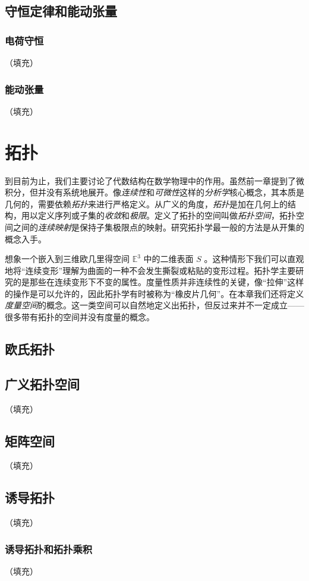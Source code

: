 \documentclass[hyperref,UTF8]{ctexbook}
\begin{document}
\section{守恒定律和能动张量}

\subsection{电荷守恒}（填充）
\subsection{能动张量}（填充）
\chapter{拓扑}
到目前为止，我们主要讨论了代数结构在数学物理中的作用。虽然前一章提到了微积分，但并没有系统地展开。像\emph{连续性}和\emph{可微性}这样的\emph{分析学}核心概念，其本质是几何的，需要依赖\emph{拓扑}来进行严格定义。从广义的角度，\emph{拓扑}是加在几何上的结构，用以定义序列或子集的\emph{收敛}和\emph{极限}。定义了拓扑的空间叫做\emph{拓扑空间}，拓扑空间之间的\emph{连续映射}是保持子集极限点的映射。研究拓扑学最一般的方法是从开集的概念入手。

想象一个嵌入到三维欧几里得空间 $\mathbb{E}^{3}$ 中的二维表面 $S$ 。这种情形下我们可以直观地将“连续变形”理解为曲面的一种不会发生撕裂或粘贴的变形过程。拓扑学主要研究的是那些在连续变形下不变的属性。度量性质并非连续性的关键，像“拉伸”这样的操作是可以允许的，因此拓扑学有时被称为“橡皮片几何”。在本章我们还将定义\emph{度量空间}的概念。这一类空间可以自然地定义出拓扑，但反过来并不一定成立——很多带有拓扑的空间并没有度量的概念。
\section{欧氏拓扑}

\section{广义拓扑空间}（填充）
\section{矩阵空间}（填充）
\section{诱导拓扑}（填充）
\subsection{诱导拓扑和拓扑乘积}（填充）
\end{document}
